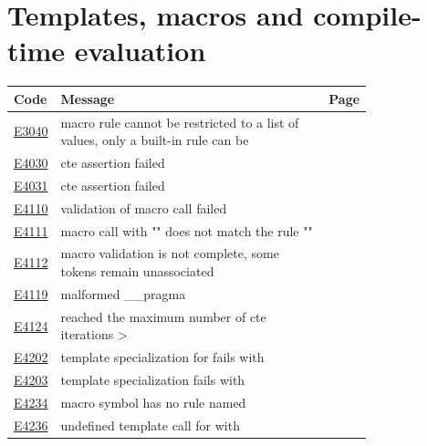 
\clearpage
\section{Templates, macros and compile-time evaluation}
\label{sec:codes:templates}

\begin{longtable}{@{}l p{0.78\linewidth} r@{}}
\toprule Code & Message & Page\\ \midrule \endhead
\hyperref[sec:codes:e3040]{E3040} & macro rule \errhole{} cannot be restricted to a list of values, only a built-in rule can be & \pageref{sec:codes:e3040}\\
\hyperref[sec:codes:e4030]{E4030} & cte assertion failed & \pageref{sec:codes:e4030}\\
\hyperref[sec:codes:e4031]{E4031} & cte assertion failed \errhole{} & \pageref{sec:codes:e4031}\\
\hyperref[sec:codes:e4110]{E4110} & validation of macro call failed & \pageref{sec:codes:e4110}\\
\hyperref[sec:codes:e4111]{E4111} & macro call with "\errhole{}" does not match the rule "\errhole{}" & \pageref{sec:codes:e4111}\\
\hyperref[sec:codes:e4112]{E4112} & macro validation is not complete, some tokens remain unassociated  \errhole{} \errhole{} \errhole{} & \pageref{sec:codes:e4112}\\
\hyperref[sec:codes:e4119]{E4119} & malformed \_\_pragma \errhole{} & \pageref{sec:codes:e4119}\\
\hyperref[sec:codes:e4124]{E4124} & reached the maximum number of cte iterations \errhole{} \textgreater{} \errhole{} & \pageref{sec:codes:e4124}\\
\hyperref[sec:codes:e4202]{E4202} & template specialization for \errhole{} fails with \errhole{} & \pageref{sec:codes:e4202}\\
\hyperref[sec:codes:e4203]{E4203} & template specialization fails with \errhole{} & \pageref{sec:codes:e4203}\\
\hyperref[sec:codes:e4234]{E4234} & macro symbol \errhole{} has no rule named \errhole{} & \pageref{sec:codes:e4234}\\
\hyperref[sec:codes:e4236]{E4236} & undefined template call for \errhole{} with \errhole{} & \pageref{sec:codes:e4236}\\

\end{longtable}
